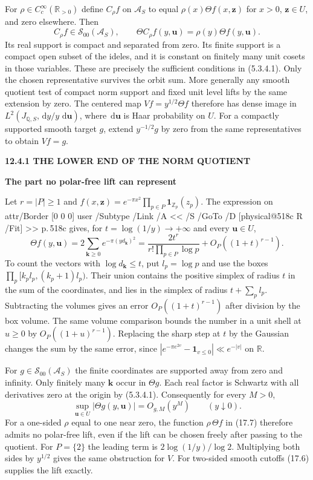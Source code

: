 \documentclass[11pt,letterpaper]{article}
\makeatletter
\newcommand{\rightmarktext}{}
\newcommand{\printfolio}{}
\newcommand{\leaf}[4]{\clearpage\gdef\printfolio{#1}\gdef\rightmarktext{#2}%
  {\small\sffamily\bfseries\color{ink}#3\par}\vspace{3pt}%
  {\LARGE\bfseries #4\par}\vspace{5pt}}
\newcommand{\R}{\mathbb R}
\newcommand{\Q}{\mathbb Q}
\newcommand{\Z}{\mathbb Z}
\newcommand{\dd}{\,\mathrm d}
\newcommand{\MusicPDFPageRef}[1]{\pdfpageref\csname physical@#1\endcsname\space\space 0 R}
\newcommand{\pagelink}[2]{\leavevmode\pdfstartlink attr{/Border [0 0 0]} user{%
  /Subtype /Link /A << /S /GoTo /D [\MusicPDFPageRef{#1} /Fit] >>}%
  {\color{ink}#2}\pdfendlink}
\newcommand{\pg}[1]{\pagelink{#1}{p.\,#1}}
\makeatother
\begin{document}
For $\rho\in C_c^\infty(\R_{>0})$ define $C_\rho f$ on $\mathcal A_S$
to equal $\rho(x)\Theta f(x,\mathbf z)$ for $x>0$, $\mathbf z\in U$,
and zero elsewhere. Then
\[
       C_\rho f\in\mathcal S_{00}(\mathcal A_S),\qquad
       \Theta C_\rho f(y,\mathbf u)=\rho(y)\Theta f(y,\mathbf u).
 \tag{17.6}
\]
Its real support is compact and separated from zero. Its finite support
is a compact open subset of the ideles, and it is constant on finitely
many unit cosets in those variables. These are precisely the sufficient
conditions in (5.3.4.1). Only the chosen representative survives the
orbit sum. More generally any smooth quotient test of compact norm
support and fixed unit level lifts by the same extension by zero.
The centered map $Vf=y^{1/2}\Theta f$ therefore has dense image in
$L^2(J_{\Q,S},\dd y/y\,\dd\mathbf u)$, where $\dd\mathbf u$ is Haar
probability on $U$. For a compactly supported smooth target $g$,
extend $y^{-1/2}g$ by zero from the same representatives to obtain
$Vf=g$.

\leaf{518d}{The one-sided range}{12.4.1 \quad THE LOWER END OF THE NORM QUOTIENT}{The part no polar-free lift can represent}
Let $r=|P|\ge1$ and $f(x,\mathbf z)=e^{-\pi x^2}\prod_{p\in P}
\mathbf1_{\Z_p}(z_p)$. The expression on \pg{518c} gives, for
$t=\log(1/y)\to+\infty$ and every $\mathbf u\in U$,
\[
 \Theta f(y,\mathbf u)=2\sum_{\mathbf k\ge0}
                  e^{-\pi (y d_{\mathbf k})^2}
   =\frac{2t^r}{r!\prod_{p\in P}\log p}
         +O_P((1+t)^{r-1}).
 \tag{17.7}
\]
To count the vectors with $\log d_{\mathbf k}\le t$, put
$l_p=\log p$ and use the boxes $\prod_p[k_p l_p,(k_p+1)l_p)$.
Their union contains the positive simplex of radius $t$ in the sum
of the coordinates, and lies in the simplex of radius $t+\sum_p l_p$.
Subtracting the volumes gives an error $O_P((1+t)^{r-1})$ after division
by the box volume. The same volume comparison bounds the number in
a unit shell at $u\ge0$ by $O_P((1+u)^{r-1})$.
Replacing the sharp step at $t$ by the Gaussian changes the sum by
the same error, since
$|e^{-\pi e^{2v}}-\mathbf1_{v\le0}|\ll e^{-|v|}$ on $\R$.

For $g\in\mathcal S_{00}(\mathcal A_S)$ the finite coordinates are
supported away from zero and infinity. Only finitely many $\mathbf k$
occur in $\Theta g$. Each real factor is Schwartz with all derivatives
zero at the origin by (5.3.4.1). Consequently for every $M>0$,
\[
              \sup_{\mathbf u\in U}|\Theta g(y,\mathbf u)|=O_{g,M}(y^M)
                     \qquad(y\downarrow0).
\]
For a one-sided $\rho$ equal to one near zero, the function
$\rho\,\Theta f$ in (17.7) therefore admits no polar-free lift, even
if the lift can be chosen freely after passing to the quotient.
For $P=\{2\}$ the leading term is $2\log(1/y)/\log 2$.
Multiplying both sides by $y^{1/2}$ gives the same obstruction for $V$.
For two-sided smooth cutoffs (17.6) supplies the lift exactly.
\end{document}
